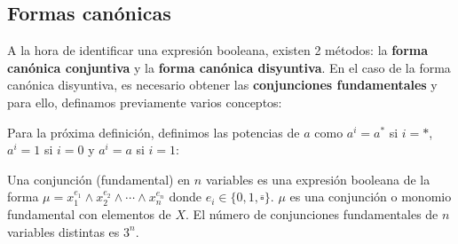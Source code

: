 \subsection{Formas canónicas}
A la hora de identificar una expresión booleana, existen 2 métodos: la \textbf{forma canónica conjuntiva} y la \textbf{forma canónica disyuntiva}.
En el caso de la forma canónica disyuntiva, es necesario obtener las \textbf{conjunciones fundamentales} y para ello, definamos previamente varios conceptos:

Para la próxima definición, definimos las potencias de $a$ como $a^i = a^*$ si $i = *$, $a^i = 1$ si $i = 0$ y $a^i = a$ si $i = 1$:
\begin{ndef}
    Una conjunción (fundamental) en $n$ variables es una expresión booleana de la forma $\mu = x_1^{e_1} \land x_2^{e_2} \land \cdots \land x_n^{e_n}$ donde $e_i \in \{0,1,\overline{\square}\}$. $\mu$ es una conjunción o monomio fundamental con elementos de $X$.
    El número de conjunciones fundamentales de $n$ variables distintas es $3^n$.
\end{ndef}

